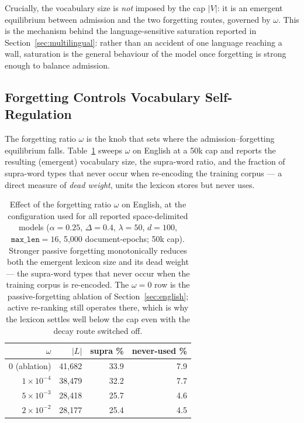Crucially, the vocabulary size is \emph{not} imposed by the cap $|V|$: it is an
emergent equilibrium between admission and the two forgetting routes, governed
by $\omega$.
This is the mechanism behind the language-sensitive saturation reported in
Section~\ref{sec:multilingual}: rather than an accident of one language reaching
a wall, saturation is the general behaviour of the model once forgetting is
strong enough to balance admission.


\subsection{Forgetting Controls Vocabulary Self-Regulation}
\label{sec:forgetting-results}

The forgetting ratio $\omega$ is the knob that sets where the
admission--forgetting equilibrium falls.
Table~\ref{tab:omega} sweeps $\omega$ on English at a 50k cap and reports the
resulting (emergent) vocabulary size, the supra-word ratio, and the fraction of
supra-word types that never occur when re-encoding the training corpus — a
direct measure of \emph{dead weight}, units the lexicon stores but never uses.

\begin{table}[t]
\centering
\small
\begin{tabular}{rrrr}
\toprule
$\omega$ & \textbf{$|L|$} & \textbf{supra \%} & \textbf{never-used \%} \\
\midrule
$0$ (ablation)   & 41{,}682 & 33.9 & 7.9 \\
$1\times10^{-4}$ & 38{,}479 & 32.2 & 7.7 \\
$5\times10^{-3}$ & 28{,}418 & 25.7 & 4.6 \\
$2\times10^{-2}$ & 28{,}177 & 25.4 & 4.5 \\
\bottomrule
\end{tabular}
\caption{Effect of the forgetting ratio $\omega$ on English, at the
configuration used for all reported space-delimited models ($\alpha{=}0.25$,
$\Delta{=}0.4$, $\lambda{=}50$, $d{=}100$, $\texttt{max\_len}{=}16$,
5{,}000 document-epochs; 50k cap). Stronger passive forgetting monotonically
reduces both the emergent lexicon size and its dead weight — the supra-word
types that never occur when the training corpus is re-encoded. The
$\omega{=}0$ row is the passive-forgetting ablation of
Section~\ref{sec:english}; active re-ranking still operates there, which is
why the lexicon settles well below the cap even with the decay route switched
off.}
\label{tab:omega}
\end{table}

